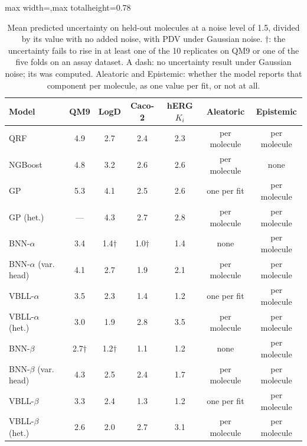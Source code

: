 \begin{table}[!htbp]
\centering
\small
\begin{adjustbox}{max width=\textwidth,max totalheight=0.78\textheight}
\begin{tabular}{lcccccc}
\toprule
Model & QM9 & LogD & Caco-2 & hERG $K_i$ & Aleatoric & Epistemic \\
\midrule
QRF & 4.9 & 2.7 & 2.4 & 2.3 & per molecule & per molecule \\
NGBoost & 4.8 & 3.2 & 2.6 & 2.6 & per molecule & none \\
GP & 5.3 & 4.1 & 2.5 & 2.6 & one per fit & per molecule \\
GP (het.) & --- & 4.3 & 2.7 & 2.8 & per molecule & per molecule \\
BNN-$\alpha$ & 3.4 & 1.4$\dagger$ & 1.0$\dagger$ & 1.4 & none & per molecule \\
BNN-$\alpha$ (var. head) & 4.1 & 2.7 & 1.9 & 2.1 & per molecule & per molecule \\
VBLL-$\alpha$ & 3.5 & 2.3 & 1.4 & 1.2 & one per fit & per molecule \\
VBLL-$\alpha$ (het.) & 3.0 & 1.9 & 2.8 & 3.5 & per molecule & per molecule \\
BNN-$\beta$ & 2.7$\dagger$ & 1.2$\dagger$ & 1.1 & 1.2 & none & per molecule \\
BNN-$\beta$ (var. head) & 4.3 & 2.5 & 2.4 & 1.7 & per molecule & per molecule \\
VBLL-$\beta$ & 3.3 & 2.4 & 1.3 & 1.2 & one per fit & per molecule \\
VBLL-$\beta$ (het.) & 2.6 & 2.0 & 2.7 & 3.1 & per molecule & per molecule \\
\bottomrule
\end{tabular}
\end{adjustbox}

\caption[Rise in mean predicted uncertainty under Gaussian noise.]{Mean predicted uncertainty on held-out molecules at a noise level of 1.5, divided by its value with no added noise, with PDV under Gaussian noise. $\dagger$: the uncertainty fails to rise in at least one of the 10 replicates on QM9 or one of the five folds on an assay dataset. A dash: no uncertainty result under Gaussian noise; its \aucnorm{} was computed. Aleatoric and Epistemic: whether the model reports that component per molecule, as one value per fit, or not at all.}
\label{tab:uncertainty_rise}
\end{table}

